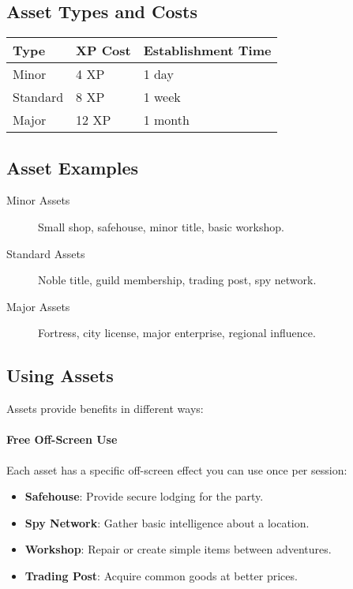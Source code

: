 \subsection*{Asset Types and Costs}
\begin{center}
\small
\begin{tabular}{lll}
\toprule
\textbf{Type} & \textbf{XP Cost} & \textbf{Establishment Time} \\
\midrule
Minor   & 4 XP  & 1 day \\
Standard& 8 XP  & 1 week \\
Major   & 12 XP & 1 month \\
\bottomrule
\end{tabular}
\end{center}

\subsection*{Asset Examples}
\begin{description}
\item[Minor Assets] Small shop, safehouse, minor title, basic workshop.
\item[Standard Assets] Noble title, guild membership, trading post, spy network.
\item[Major Assets] Fortress, city license, major enterprise, regional influence.
\end{description}

\subsection*{Using Assets}
Assets provide benefits in different ways:

\paragraph{Free Off-Screen Use}
Each asset has a specific off-screen effect you can use once per session:
\begin{itemize}
\item \textbf{Safehouse}: Provide secure lodging for the party.
\item \textbf{Spy Network}: Gather basic intelligence about a location.
\item \textbf{Workshop}: Repair or create simple items between adventures.
\item \textbf{Trading Post}: Acquire common goods at better prices.
\end{itemize}

